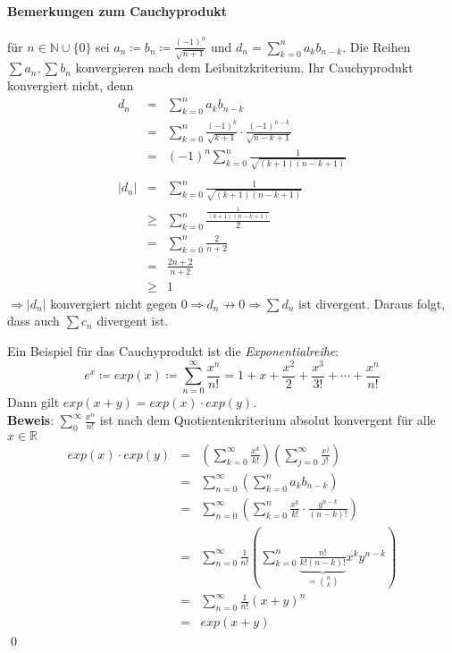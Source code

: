 \documentclass[ngerman,titlepage,twoside, parskip=half*]{scrreprt}
\newcommand*{\N}{\mathbb{N}}
\newcommand*{\R}{\mathbb{R}}
\theoremstyle{plain}
\theoremstyle{definition}
\theoremstyle{remark}
\begin{document}
\paragraph{Bemerkungen zum Cauchyprodukt} für $n\in \N\cup \{0\}$ sei
$a_n\coloneqq b_n\coloneqq\frac{(-1)^n}{\sqrt{n+1}}$ und 
$d_n=\sum_{k=0}^n a_kb_{n-k}$. Die Reihen $\sum a_n, \sum b_n$ konvergieren nach dem Leibnitzkriterium. Ihr 
Cau\-chy\-pro\-dukt konvergiert nicht, denn 
\begin{align*}
  d_n & = & \sum_{k=0}^n a_k b_{n-k}\\
  & = & \sum_{k=0}^n \frac{(-1)^k}{\sqrt{k+1}}\cdot \frac{(-1)^{n-k}}{\sqrt{n-k+1}}\\
  & = & (-1)^n \sum_{k=0}^n \frac{1}{\sqrt{(k+1)(n-k+1)}}\\
  \\
  |d_n| & = & \sum_{k=0}^n \frac{1}{\sqrt{(k+1)(n-k+1)}}\\
  & \geq & \sum_{k=0}^n \frac{\frac{1}{(k+1)(n-k+1)}}{2}\\
  & = & \sum_{k=0}^n \frac{2}{n+2}\\
  & = & \frac{2n+2}{n+2}\\
  & \geq & 1
\end{align*}
$\Rightarrow |d_n|$ konvergiert nicht gegen $0\Rightarrow d_n \not\rightarrow 0\Rightarrow \sum d_n$ ist divergent. Daraus
folgt, dass auch $\sum c_n$ divergent ist.

Ein Beispiel für das Cauchyprodukt ist die \emph{Exponentialreihe}:
\[e^x \coloneqq exp(x)\coloneqq\sum_{n=0}^\infty \frac{x^n}{n!}=1+x+\frac{x^2}{2}+\frac{x^3}{3!}+\cdots +\frac{x^n}{n!}\]
Dann gilt $exp(x+y)=exp(x)\cdot exp(y)$.\\
\textbf{Beweis}: $\sum_0^\infty \frac{x^n}{n!}$ ist nach dem Quotientenkriterium absolut konvergent für alle $x\in \R$
\begin{align*}
  exp(x)\cdot exp(y) & = & \left(\sum_{k=0}^\infty \frac{x^k}{k!}\right)\left(\sum_{j=0}^\infty \frac{x^j}{j!}\right)\\
  & = & \sum_{n=0}^\infty \left(\sum_{k=0}^n a_k b_{n-k}\right)\\
  & = & \sum_{n=0}^\infty \left(\sum_{k=0}^n \frac{x^k}{k!}\cdot \frac{y^{n-k}}{(n-k)!}\right)\\
  & = & \sum_{n=0}^\infty \frac{1}{n!} \left(\sum_{k=0}^n \underbrace{\frac{n!}{k!(n-k)!}}_{=\binom{n}{k}} x^k y^{n-k}\right)\\
  & = & \sum_{n=0}^\infty \frac{1}{n!}(x+y)^n\\
  & = & exp(x+y)
\end{align*}
\qed
\end{document}

